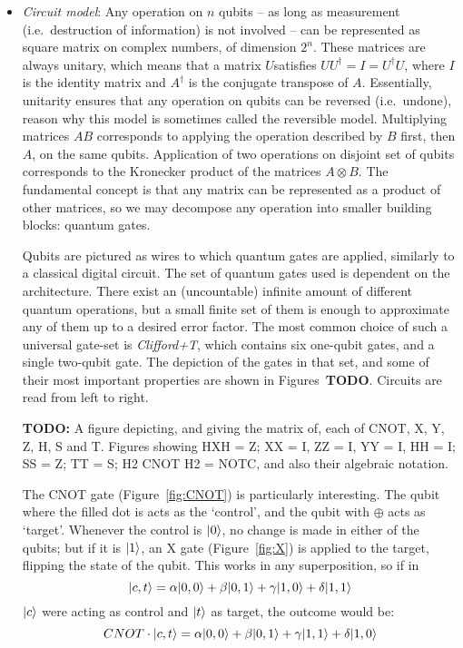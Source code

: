 \begin{itemize}

  \item \textit{Circuit model}: Any operation on \(n\) qubits -- as long as measurement (i.e.\ destruction of information) is not involved -- can be represented as square matrix on complex numbers, of dimension \(2^n\). These matrices are always unitary, which means that a matrix \(U\)satisfies \(UU^\dag = I = U^\dag U\), where \(I\) is the identity matrix and \(A^\dag\) is the conjugate transpose of \(A\). Essentially, unitarity ensures that any operation on qubits can be reversed (i.e.\ undone), reason why this model is sometimes called the reversible model. Multiplying matrices \(AB\) corresponds to applying the operation described by \(B\) first, then \(A\), on the same qubits. Application of two operations on disjoint set of qubits corresponds to the Kronecker product of the matrices \(A \otimes B\). The fundamental concept is that any matrix can be represented as a product of other matrices, so we may decompose any operation into smaller building blocks: quantum gates.

  Qubits are pictured as wires to which quantum gates are applied, similarly to a classical digital circuit. The set of quantum gates used is dependent on the architecture. There exist an (uncountable) infinite amount of different quantum operations, but a small finite set of them is enough to approximate any of them up to a desired error factor. The most common choice of such a universal gate-set is \textit{Clifford+T}, which contains six one-qubit gates, and a single two-qubit gate. The depiction of the gates in that set, and some of their most important properties are shown in Figures~\textbf{TODO}. Circuits are read from left to right.

  \textbf{TODO:} A figure depicting, and giving the matrix of, each of CNOT, X, Y, Z, H, S and T. Figures showing HXH = Z; XX = I, ZZ = I, YY = I, HH = I; SS = Z; TT = S; H2 CNOT H2 = NOTC, and also their algebraic notation.

  The CNOT gate (Figure~\ref{fig:CNOT}) is particularly interesting. The qubit where the filled dot is acts as the `control', and the qubit with \(\oplus\) acts as `target'. Whenever the control is \(\vert 0 \rangle\), no change is made in either of the qubits; but if it is \(\vert 1 \rangle\), an X gate (Figure~\ref{fig:X}) is applied to the target, flipping the state of the qubit. This works in any superposition, so if in \[\vert c,t \rangle = \alpha\vert 0,0 \rangle + \beta\vert 0,1 \rangle + \gamma\vert 1,0 \rangle + \delta\vert 1,1 \rangle\] \(\vert c \rangle\) were acting as control and \(\vert t \rangle\) as target, the outcome would be: \[CNOT \cdot \vert c,t \rangle = \alpha\vert 0,0 \rangle + \beta\vert 0,1 \rangle + \gamma\vert 1,1 \rangle + \delta\vert 1,0 \rangle\]


\end{itemize}
